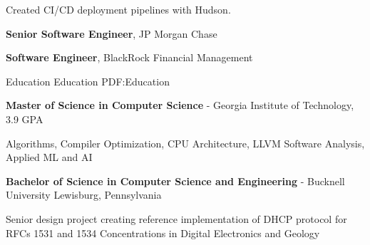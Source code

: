 \documentclass[MMMMyyyy,nonstopmode]{simpleresumecv_stacked}
\newif\ifLOCATION
\newif\ifNOTSELECTED
\begin{document}
\begin{Body}
\begin{Detail}
	Created CI/CD deployment pipelines with Hudson.
\end{Detail}
\fi %


\ifNOTSELECTED
\begin{Detail}
Created applications to build DSL circuits and track sales commissions in Java and SQL.
\end{Detail}
\fi %

\ifNOTSELECTED
\Gap
\Entry
\textbf{Senior Software Engineer}, Global Crossing/Level3

\begin{Detail}
Led multi-site teams to create telecom applications in Java and SQL.
\end{Detail}
\fi %

\Entry
\textbf{Senior Software Engineer}, JP Morgan Chase
\ifNOTSELECTED
\begin{Detail}
Created trading systems for equity derivatives and HFT trading desks in C, C++, and Excel.
\end{Detail}
\fi %

\Entry
\textbf{Software Engineer}, BlackRock Financial Management
\ifNOTSELECTED
\begin{Detail}
Developed systems for MBS mortgage, Treasury, and Repo trading desks in C and C++.
\end{Detail}
\fi %
\fi %
%

\Section
{Education}
{Education}
{PDF:Education}

\Entry
\textbf{Master of Science in Computer Science} -
Georgia Institute of Technology, 3.9 GPA

\BulletItem
Algorithms, Compiler Optimization, CPU Architecture, LLVM Software Analysis, Applied ML and AI

\iftrue %
\Gap

\Entry
\textbf{Bachelor of Science in Computer Science and Engineering} - 
Bucknell University
\ifLOCATION
\hfill Lewisburg, Pennsylvania
\fi

\iffalse
\hfill
\DatestampYM{1988}{09} --
\DatestampYM{1992}{06}
\fi
\iffalse %
\begin{Detail}
\BulletItem
Senior design project creating reference implementation of DHCP protocol for RFCs 1531 and 1534
\BulletItem
Concentrations in Digital Electronics and Geology


\end{Detail}
\end{Body}
\end{document}
